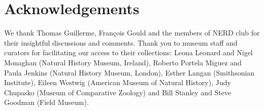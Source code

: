 \documentclass[12pt,a4paper]{article}
\begin{document}
\section{Acknowledgements} %
	We thank Thomas Guillerme, Fran\c{c}ois Gould and the members of NERD club for their insightful discussions and comments. Thank you to museum staff and curators for facilitating our access to their collections: Leona Leonard and Nigel Monaghan (Natural History Museum, Ireland), Roberto Portela Miguez and Paula Jenkins (Natural History Museum, London), Esther Langan (Smithsonian Institute), Eileen Westwig (American Museum of Natural History), Judy Chupasko (Museum of Comparative Zoology) and Bill Stanley and Steve Goodman (Field Museum).
 
 
\end{document}
